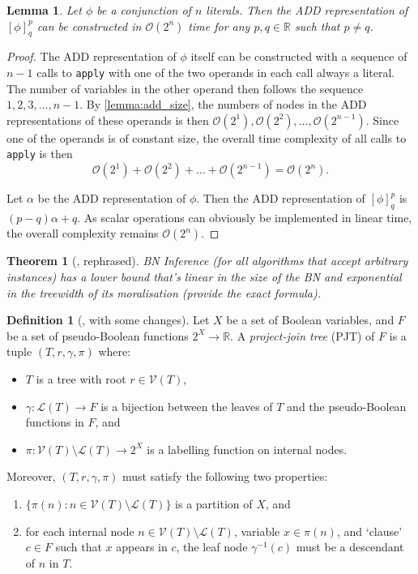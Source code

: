 \documentclass{article}
\newtheorem{theorem}{Theorem}
\newtheorem{lemma}{Lemma}
\theoremstyle{definition}
\newtheorem{definition}{Definition}
\theoremstyle{remark}
\begin{document}
\begin{lemma} \label{lemma:clause_time}
  Let $\phi$ be a conjunction of $n$ literals. Then the ADD representation of
  $[\phi]^p_q$ can be constructed in $\mathcal{O}(2^n)$ time for any $p, q \in
  \mathbb{R}$ such that $p \ne q$.
\end{lemma}
\begin{proof}
  The ADD representation of $\phi$ itself can be constructed with a sequence of
  $n-1$ calls to \texttt{apply} with one of the two operands in each call always
  a literal. The number of variables in the other operand then follows the
  sequence $1, 2, 3, \dots, n-1$. By \cref{lemma:add_size}, the numbers of nodes
  in the ADD representations of these operands is then $\mathcal{O}(2^1),
  \mathcal{O}(2^2), \dots, \mathcal{O}(2^{n-1})$. Since one of the operands is
  of constant size, the overall time complexity of all calls to \texttt{apply}
  is then
  \[
    \mathcal{O}(2^1) + \mathcal{O}(2^2) + \dots + \mathcal{O}(2^{n-1}) =
    \mathcal{O}(2^n).
  \]

  Let $\alpha$ be the ADD representation of $\phi$. Then the ADD representation
  of $[\phi]_q^p$ is $(p-q)\alpha + q$. As scalar operations can obviously be
  implemented in linear time, the overall complexity remains $\mathcal{O}(2^n)$.
\end{proof}

\begin{theorem}[\cite{DBLP:conf/ecai/KwisthoutBG10}, rephrased]
  BN Inference (for all algorithms that accept arbitrary instances) has a lower
  bound that's linear in the size of the BN and exponential in the treewidth of
  its moralisation (provide the exact formula).
\end{theorem}

\begin{definition}[\cite{DBLP:conf/cp/DudekPV20}, with some changes]
  Let $X$ be a set of Boolean variables, and $F$ be a set of pseudo-Boolean
  functions $2^X \to \mathbb{R}$. A \emph{project-join tree} (PJT) of $F$ is a
  tuple $(T, r, \gamma, \pi)$ where:
  \begin{itemize}
  \item $T$ is a tree with root $r \in \mathcal{V}(T)$,
  \item $\gamma\colon \mathcal{L}(T) \to F$ is a bijection between the leaves of
    $T$ and the pseudo-Boolean functions in $F$, and
  \item $\pi\colon \mathcal{V}(T) \setminus \mathcal{L}(T) \to 2^X$ is a
    labelling function on internal nodes.
  \end{itemize}
  Moreover, $(T, r, \gamma, \pi)$ must satisfy the following two properties:
  \begin{enumerate}
  \item $\{\pi(n) : n \in \mathcal{V}(T) \setminus \mathcal{L}(T)\}$ is a
    partition of $X$, and
  \item for each internal node $n \in \mathcal{V}(T) \setminus \mathcal{L}(T)$,
    variable $x \in \pi(n)$, and `clause' $c \in F$ such that $x$
    appears in $c$, the leaf node $\gamma^{-1}(c)$ must be a descendant of $n$
    in $T$.
  \end{enumerate}
\end{definition}
\end{document}
